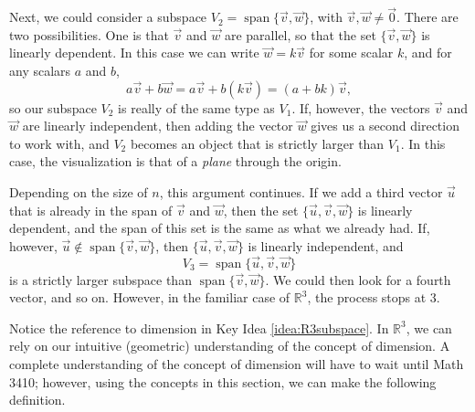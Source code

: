 Next, we could consider a subspace $V_2 = \operatorname{span}\{\vec v, \vec w\}$, with $\vec v, \vec w \neq \vec 0$. There are two possibilities. One is that $\vec v$ and $\vec w$ are parallel, so that the set $\{\vec v,\vec w\}$ is linearly dependent. In this case we can write $\vec w = k\vec v$ for some scalar $k$, and for any scalars $a$ and $b$,
\[
a\vec v+b\vec w = a\vec v + b(k\vec v) = (a+bk)\vec v,
\]
so our subspace $V_2$ is really of the same type as $V_1$. If, however, the vectors $\vec v$ and $\vec w$ are linearly independent, then adding the vector $\vec w$ gives us a second direction to work with, and $V_2$ becomes an object that is strictly larger than $V_1$. In this case, the visualization is that of a \textit{plane} through the origin.

Depending on the size of $n$, this argument continues. If we add a third vector $\vec u$ that is already in the span of $\vec v$ and $\vec w$, then the set $\{\vec u, \vec v,\vec w\}$ is linearly dependent, and the span of this set is the same as what we already had. If, however, $\vec u \notin\operatorname{span}\{\vec v, \vec w\}$, then $\{\vec u, \vec v,\vec w\}$ is linearly independent, and
\[
V_3 = \operatorname{span}\{\vec u, \vec v, \vec w\}
\]
is a strictly larger subspace than $\operatorname{span}\{\vec v, \vec w\}$. We could then look for a fourth vector, and so on. However, in the familiar case of $\mathbb{R}^3$, the process stops at 3.

\smallskip


\smallskip

Notice the reference to dimension in Key Idea \ref{idea:R3subspace}. In $\mathbb{R}^3$, we can rely on our intuitive (geometric) understanding of the concept of dimension. A complete understanding of the concept of dimension will have to wait until Math 3410; however, using the concepts in this section, we can make the following definition.

